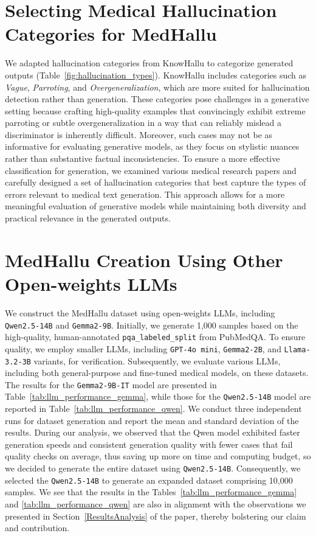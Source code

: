 \section{Selecting Medical Hallucination Categories for MedHallu} \label{sec:hallu_categories}
We adapted hallucination categories from KnowHallu \cite{KnowHallu} to categorize generated outputs (Table~\ref{fig:hallucination_types}). KnowHallu includes categories such as \textit{Vague}, \textit{Parroting}, and \textit{Overgeneralization}, which are more suited for hallucination detection rather than generation. These categories pose challenges in a generative setting because crafting high-quality examples that convincingly exhibit extreme parroting or subtle overgeneralization in a way that can reliably mislead a discriminator is inherently difficult. Moreover, such cases may not be as informative for evaluating generative models, as they focus on stylistic nuances rather than substantive factual inconsistencies. To ensure a more effective classification for generation, we examined various medical research papers and carefully designed a set of hallucination categories that best capture the types of errors relevant to medical text generation. This approach allows for a more meaningful evaluation of generative models while maintaining both diversity and practical relevance in the generated outputs.





\section{MedHallu Creation Using Other Open-weights LLMs} \label{Gen_robust_check}

We construct the MedHallu dataset using open-weights LLMs, including \texttt{Qwen2.5-14B} and \texttt{Gemma2-9B}. Initially, we generate 1,000 samples based on the high-quality, human-annotated \texttt{pqa\_labeled\_split} from PubMedQA. To ensure quality, we employ smaller LLMs, including \texttt{GPT-4o mini}, \texttt{Gemma2-2B}, and \texttt{Llama-3.2-3B} variants, for verification. Subsequently, we evaluate various LLMs, including both general-purpose and fine-tuned medical models, on these datasets. The results for the \texttt{Gemma2-9B-IT} model are presented in Table~\ref{tab:llm_performance_gemma}, while those for the \texttt{Qwen2.5-14B} model are reported in Table~\ref{tab:llm_performance_qwen}. We conduct three independent runs for dataset generation and report the mean and standard deviation of the results. During our analysis, we observed that the Qwen model exhibited faster generation speeds and consistent generation quality with fewer cases that fail quality checks on average, thus saving up more on time and computing budget, so we decided to generate the entire dataset using \texttt{Qwen2.5-14B}. Consequently, we selected the \texttt{Qwen2.5-14B} to generate an expanded dataset comprising 10,000 samples. We see that the results in the Tables~\ref{tab:llm_performance_gemma} and \ref{tab:llm_performance_qwen} are also in alignment with the observations we presented in Section~\ref{ResultsAnalysis} of the paper, thereby bolstering our claim and contribution.


